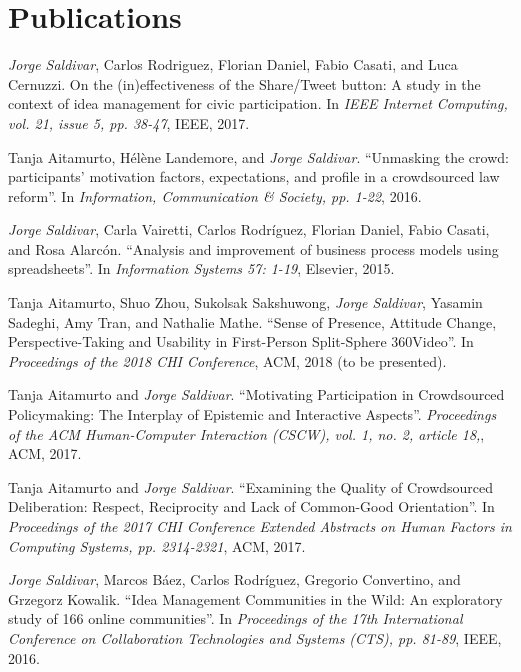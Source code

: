 
\section{Publications}


\textit{Jorge Saldivar}, Carlos Rodriguez, Florian Daniel, Fabio Casati, and Luca Cernuzzi. On the (in)effectiveness of the Share/Tweet button: A study in the context of idea management for civic participation. In \textit{IEEE Internet Computing, vol. 21, issue 5, pp. 38-47}, IEEE, 2017.

Tanja Aitamurto, Hélène Landemore, and \textit{Jorge Saldivar}. ``Unmasking the crowd: participants’ motivation factors, expectations, and profile in a crowdsourced law reform''. In \textit{Information, Communication \& Society, pp. 1-22}, 2016.

\textit{Jorge Saldivar}, Carla Vairetti, Carlos Rodríguez, Florian Daniel, Fabio Casati, and Rosa Alarcón. ``Analysis and improvement of business process models using spreadsheets''. In \textit{Information Systems 57: 1-19}, Elsevier, 2015.


Tanja Aitamurto, Shuo Zhou, Sukolsak Sakshuwong, \textit{Jorge Saldivar}, Yasamin Sadeghi, Amy Tran, and Nathalie Mathe. ``Sense of Presence, Attitude Change, Perspective-Taking and Usability in First-Person Split-Sphere 360\degree Video''. In \textit{Proceedings of the 2018 CHI Conference}, ACM, 2018 (to be presented).

Tanja Aitamurto and \textit{Jorge Saldivar}. ``Motivating Participation in Crowdsourced Policymaking: The Interplay of Epistemic and Interactive Aspects''. \textit{Proceedings of the ACM Human-Computer Interaction (CSCW), vol. 1, no. 2, article 18,}, ACM, 2017.

Tanja Aitamurto and \textit{Jorge Saldivar}. ``Examining the Quality of Crowdsourced Deliberation: Respect, Reciprocity and Lack of Common-Good Orientation''. In \textit{Proceedings of the 2017 CHI Conference Extended Abstracts on Human Factors in Computing Systems, pp. 2314-2321}, ACM, 2017.

\textit{Jorge Saldivar}, Marcos Báez, Carlos Rodríguez, Gregorio Convertino, and Grzegorz Kowalik. ``Idea Management Communities in the Wild: An exploratory study of 166 online communities''. In \textit{Proceedings of the 17th International Conference on Collaboration Technologies and Systems (CTS), pp. 81-89}, IEEE, 2016.

